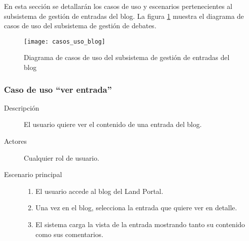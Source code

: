 En esta sección se detallarán los casos de uso y escenarios pertenecientes al subsistema de gestión de entradas del blog. La figura \ref{fig:casos_uso_subsistema_blog} muestra el diagrama de casos de uso del subsistema de gestión de debates.

\begin{figure}[h]
\centering
\texttt{[image: casos\_uso\_blog]}
\caption{Diagrama de casos de uso del subsistema de gestión de entradas del blog}
\label{fig:casos_uso_subsistema_blog}
\end{figure}


\subsubsection{Caso de uso ``ver entrada''}
\begin{description}
\item[Descripción] 				El usuario quiere ver el contenido de una entrada del blog.
\item[Actores]					Cualquier rol de usuario.
\item[Escenario principal]	 	\hfill
								\begin{enumerate}
								\item El usuario accede al blog del Land Portal.
								\item Una vez en el blog, selecciona la entrada que quiere ver en detalle.
								\item El sistema carga la vista de la entrada mostrando tanto su contenido como sus comentarios.
								\end{enumerate}
\end{description}



